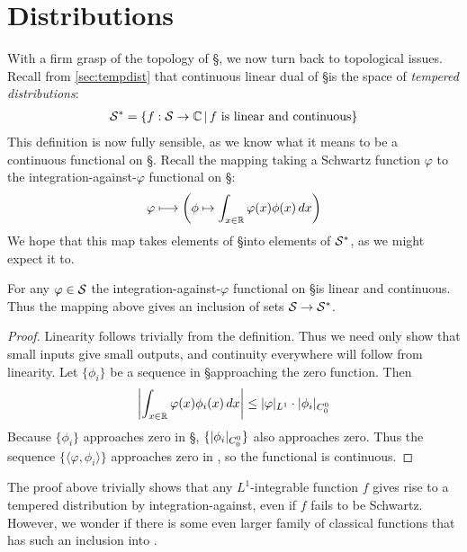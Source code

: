 
  \setcounter{chapter}{2}
  \setcounter{thm}{0}
  \chapter{Distributions}
  \label{ch:dist}
  
  With a firm grasp of the topology of \S, we now turn back to topological issues.
  Recall from \cref{sec:tempdist} that continuous linear dual of \S is the space of \emph{tempered distributions}:
  \begin{align*}
    \S^* = \{f:\S\rightarrow\C\,\vert\,f\text{ is linear and continuous}\}
  \end{align*}
  This definition is now fully sensible, as we know what it means to be a continuous functional on \S.
  Recall the mapping taking a Schwartz function $\varphi$ to the integration-against-$\varphi$ functional on \S:
  \begin{align*}
    \varphi \longmapsto \left( \phi \mapsto \int_{x\in\R} \varphi(x) \phi(x)\,dx \right)
  \end{align*}
  We hope that this map takes elements of \S into elements of $\S^*$, as we might expect it to.
  \begin{thm}
    \label{thm:intagainstiscont}
    For any $\varphi\in\S$ the integration-against-$\varphi$ functional on \S is linear and continuous.
    Thus the mapping above gives an inclusion of sets $\S\rightarrow\S^*$.
  \end{thm}
  \begin{proof}
    Linearity follows trivially from the definition.
    Thus we need only show that small inputs give small outputs, and continuity everywhere will follow from linearity.
    Let $\{\phi_i\}$ be a sequence in \S approaching the zero function.
    Then
    \begin{align*}
      \left|\int_{x\in\R} \varphi(x)\phi_i(x)\,dx\right|
      \le |\varphi|_{L^1}\cdot |\phi_i|_\Coo
    \end{align*}
    Because $\{\phi_i\}$ approaches zero in \S, $\{|\phi_i|_\Coo\}$ also approaches zero.
    Thus the sequence $\{\langle \varphi,\phi_i\rangle\}$ approaches zero in \C, so the functional is continuous.
  \end{proof}
  The proof above trivially shows that any $L^1$-integrable function $f$ gives rise to a tempered distribution by integration-against, even if $f$ fails to be Schwartz.
  However, we wonder if there is some even larger family of classical functions that has such an inclusion into \SS.
